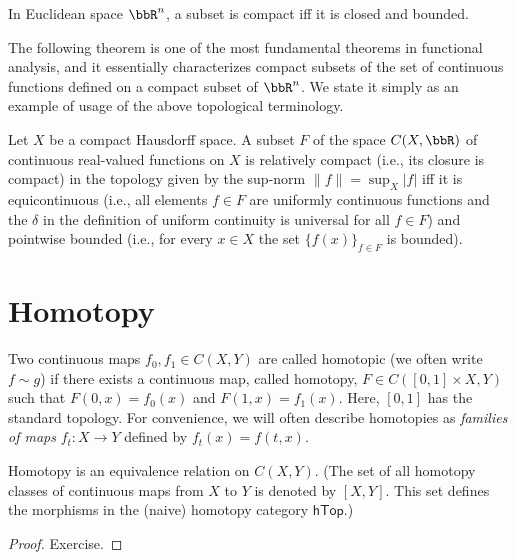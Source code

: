\begin{thm}
    In Euclidean space $\bbR^n$, a subset is compact iff it is closed and bounded.
\end{thm}

The following theorem is one of the most fundamental theorems in functional analysis, and it essentially characterizes compact subsets of the set of continuous functions defined on a compact subset of $\bbR^n$. We state it simply as an example of usage of the above topological terminology.
\begin{thm}
    Let $X$ be a compact Hausdorff space. A subset $F$ of the space $C(X,\bbR )$ of continuous real-valued functions on $X$ is relatively compact (i.e., its closure is compact) in the topology given by the sup-norm $\lVert f\rVert=\sup_X \vert f\rvert$ iff it is equicontinuous (i.e., all elements $f\in F$ are uniformly continuous functions and the $\delta$ in the definition of uniform continuity is universal for all $f\in F$) and pointwise bounded (i.e., for every $x\in X$ the set $\{f(x)\}_{f\in F}$ is bounded).
\end{thm}







\section{Homotopy}\label{sec.homotopy}

\begin{defn} 
    Two continuous maps $f_0,f_1\in C(X, Y)$ are called homotopic (we often write $f\sim g$) if there exists a continuous map, called homotopy, $F\in C([0,1]\times X,Y)$ such that $F(0,x)=f_0(x)$ and $F(1,x)=f_1(x)$. Here, $[0,1]$ has the standard topology. For convenience, we will often describe homotopies as \emph{families of maps} $f_t:X\to Y$ defined by $f_t(x)=f(t,x)$.
\end{defn}
\begin{prop}
    Homotopy is an equivalence relation on $C(X,Y)$. (The set of all homotopy classes of continuous maps from $X$ to $Y$ is denoted by $[X,Y]$. This set defines the morphisms in the (naive) homotopy category $\mathsf{hTop}$.)
\end{prop}
\begin{proof}
    Exercise.
\end{proof}

